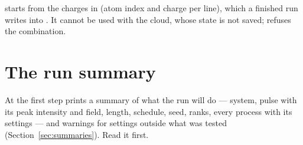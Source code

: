  starts from the charges in  (atom index and charge per line), which a
finished run writes into .
It cannot be used with the cloud, whose state is not saved;  refuses the combination.

\section{The run summary}

At the first step  prints a summary of what the run will do --- system, pulse with its peak intensity and
field, length, schedule, seed, ranks, every process with its settings --- and warnings for settings outside what was
tested (Section~\ref{sec:summaries}).
Read it first.
